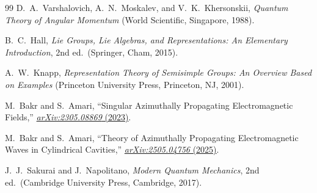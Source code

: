 \documentclass[
  aip,
  amsmath,amssymb,
  preprint
]{revtex4-1}
\begin{document}
\begin{thebibliography}{99}
D.~A.~Varshalovich, A.~N.~Moskalev, and V.~K.~Khersonskii, \textit{Quantum Theory of Angular Momentum} (World Scientific, Singapore, 1988).

B.~C.~Hall, \textit{Lie Groups, Lie Algebras, and Representations: An Elementary Introduction}, 2nd ed.\ (Springer, Cham, 2015).

A.~W.~Knapp, \textit{Representation Theory of Semisimple Groups: An Overview Based on Examples} (Princeton University Press, Princeton, NJ, 2001).

M.~Bakr and S.~Amari, ``Singular Azimuthally Propagating Electromagnetic Fields,'' \href{https://arxiv.org/abs/2305.08869}{\emph{arXiv:2305.08869} (2023)}.

M.~Bakr and S.~Amari, ``Theory of Azimuthally Propagating Electromagnetic Waves in Cylindrical Cavities,'' \href{https://arxiv.org/abs/2505.04756}{\emph{arXiv:2505.04756} (2025)}.

J.~J.~Sakurai and J.~Napolitano, \textit{Modern Quantum Mechanics}, 2nd ed.\ (Cambridge University Press, Cambridge, 2017).

\end{thebibliography}
\end{document}
